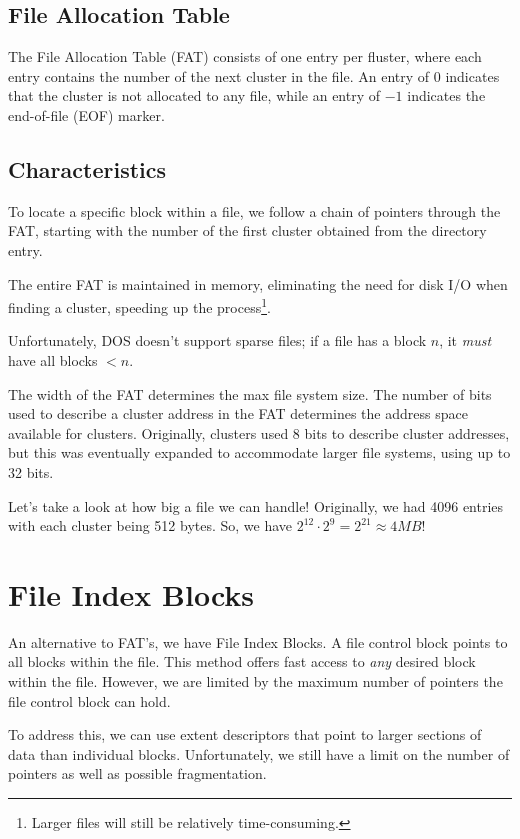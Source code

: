 \documentclass{report}
\newcommand{\exampleBegin}[1]{\begin{tcolorbox}[colback=blue!5!white,colframe=black!75!blue,title={Example:
      #1}]}
\newcommand{\exampleEnd}{\end{tcolorbox}}
\begin{document}
\subsection{File Allocation Table}
The File Allocation Table (FAT) consists of one entry per fluster, where each entry contains the
number of the next cluster in the file. An entry of 0 indicates that the cluster is not allocated to
any file, while an entry of $-1$ indicates the end-of-file (EOF) marker.


\subsection{Characteristics}
To locate a specific block within a file, we follow a chain of pointers through the FAT, starting
with the number of the first cluster obtained from the directory entry.

The entire FAT is maintained in memory, eliminating the need for disk I/O when finding a cluster,
speeding up the process\footnote{Larger files will still be relatively time-consuming.}.

Unfortunately, DOS doesn't support sparse files; if a file has a block $n$, it \textit{must} have
all blocks $< n$.

The width of the FAT determines the max file system size. The number of bits used to describe a
cluster address in the FAT determines the address space available for clusters. Originally, clusters
used 8 bits to describe cluster addresses, but this was eventually expanded to accommodate larger
file systems, using up to 32 bits.


\exampleBegin{File Size}
Let's take a look at how big a file we can handle! Originally, we had 4096 entries with each cluster
being 512 bytes. So, we have $2^{12} \cdot 2^9 = 2^{21} \approx 4MB$!
\exampleEnd


\section{File Index Blocks}
An alternative to FAT's, we have File Index Blocks. A file control block points to all blocks within
the file. This method offers fast access to \textit{any} desired block within the file. However, we
are limited by the maximum number of pointers the file control block can hold.

To address this, we can use extent descriptors that point to larger sections of data than individual
blocks. Unfortunately, we still have a limit on the number of pointers as well as possible fragmentation.
\end{document}
